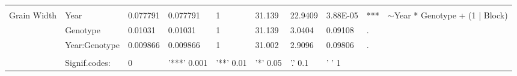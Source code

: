 \documentclass{article}
\begin{document}
\begin{table}[ht]
\begin{adjustbox}
\begin{tabular}{@{}llllllllll@{}}
			                                       &               &          &             &           &          &          &                     &     &                                                                   \\
			\multirow{3}{*}{Grain Width}           & Year          & 0.077791 & 0.077791    & 1         & 31.139   & 22.9409  & 3.88E-05            & *** & \multirow{3}{*}{$\sim$Year * Genotype + (1 | Block)}              \\
			                                       & Genotype      & 0.01031  & 0.01031     & 1         & 31.139   & 3.0404   & 0.09108             & .   &                                                                   \\
			                                       & Year:Genotype & 0.009866 & 0.009866    & 1         & 31.002   & 2.9096   & 0.09806             & .   &                                                                   \\
			                                       &               &          &             &           &          &          &                     &     &                                                                   \\
			                                       & Signif.codes: & 0        & '***' 0.001 & '**' 0.01 & '*' 0.05 & '.' 0.1  & ' ' 1               &     &                                                                   \\
			\bottomrule
		\end{tabular}
	\end{adjustbox}
	\label{hinxton_phenotype_stats}
\end{table}
\end{document}
